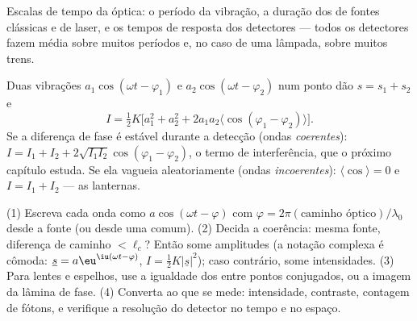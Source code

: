 \begin{omfigure}

{\small Escalas de tempo da óptica: o período da vibração, a
duração dos  de fontes clássicas e de laser, e os
tempos de resposta dos detectores --- todos os detectores fazem média sobre muitos
períodos e, no caso de uma lâmpada, sobre muitos trens.}
\end{omfigure}

\begin{remark}\label{rem:b2:scalar-light-model:superposition}
Duas vibrações $a_1\cos(\omega t - \varphi_1)$ e $a_2\cos(\omega t - \varphi_2)$ num
ponto dão $s = s_1 + s_2$ e
\[
I = \tfrac12K\bigl[a_1^2 + a_2^2 + 2a_1a_2\langle\cos(\varphi_1 - \varphi_2)\rangle\bigr] .
\]
Se a diferença de fase é estável durante a detecção
(ondas \emph{coerentes}): $I = I_1 + I_2 + 2\sqrt{I_1I_2}\cos(\varphi_1 - \varphi_2)$,
o termo de interferência, que o próximo capítulo estuda. Se ela vagueia
aleatoriamente (ondas \emph{incoerentes}): $\langle\cos\rangle = 0$ e $I = I_1 +
I_2$ --- as lanternas.
\end{remark}

\begin{method}\label{met:b2:scalar-light-model:method}
(1) Escreva cada onda como $a\cos(\omega t - \varphi)$ com $\varphi = 2\pi(\text{caminho
óptico})/\lambda_0$ desde a fonte (ou desde uma  comum). (2) Decida a
coerência: mesma fonte, diferença de caminho $< \ell_c$? Então some amplitudes
(a notação complexa é cômoda: $\underline s = a\eu^{\iu(\omega t - \varphi)}$, $I =
\tfrac12K|\underline s|^2$); caso contrário, some intensidades. (3) Para lentes e
espelhos, use a igualdade dos  entre pontos conjugados, ou a
imagem da lâmina de fase. (4) Converta ao que se mede: intensidade,
contraste, contagem de fótons, e verifique a resolução do detector no tempo
e no espaço.
\end{method}


